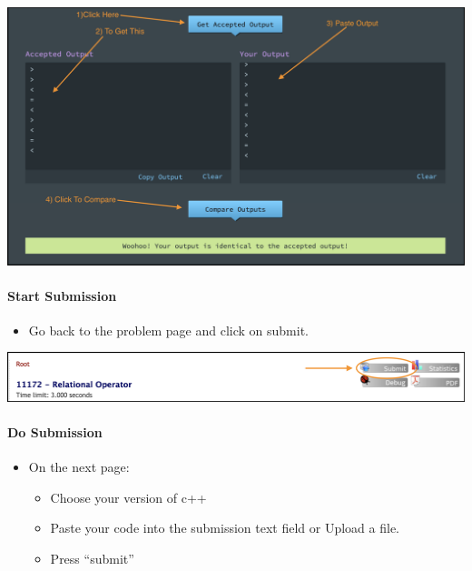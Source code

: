 \begin{center}
\includegraphics[scale=.4]{images/uhunt_results_newdata.png}
\end{center}

\hypertarget{uploading-solution}{%
\label{uploading-solution}}

\hypertarget{start-submission}{%
\paragraph{Start Submission}\label{start-submission}}

\begin{itemize}
\tightlist
\item
  Go back to the problem page and click on submit.
\end{itemize}

\begin{center}
\includegraphics[scale=.4]{images/uhunt_choose_submit.png}
\end{center}

\hypertarget{do-submission}{%
\paragraph{Do Submission}\label{do-submission}}

\begin{itemize}
\tightlist
\item
  On the next page:

  \begin{itemize}
  \tightlist
  \item
    Choose your version of c++
  \item
    Paste your code into the submission text field or Upload a file.
  \item
    Press ``submit''
  \end{itemize}
\end{itemize}


